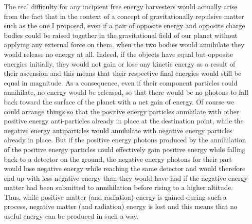 \documentclass[notitlepage,12pt]{report}
\begin{document}
The real difficulty for any incipient free energy harvesters would actually arise from the fact that in the context of a concept of gravitationally repulsive matter such as the one I proposed, even if a pair of opposite energy and opposite charge bodies could be raised together in the gravitational field of our planet without applying any external force on them, when the two bodies would annihilate they would release no energy at all. Indeed, if the objects have equal but opposite energies initially, they would not gain or lose any kinetic energy as a result of their ascension and this means that their respective final energies would still be equal in magnitude. As a consequence, even if their component particles could annihilate, no energy would be released, so that there would be no photons to fall back toward the surface of the planet with a net gain of energy. Of course we could arrange things so that the positive energy particles annihilate with other positive energy anti-particles already in place at the destination point, while the negative energy antiparticles would annihilate with negative energy particles already in place. But if the positive energy photons produced by the annihilation of the positive energy particles could effectively gain positive energy while falling back to a detector on the ground, the negative energy photons for their part would lose negative energy while reaching the same detector and would therefore end up with less negative energy than they would have had if the negative energy matter had been submitted to annihilation before rising to a higher altitude. Thus, while positive matter (and radiation) energy is gained during such a process, negative matter (and radiation) energy is lost and this means that no useful energy can be produced in such a way.
\end{document}

